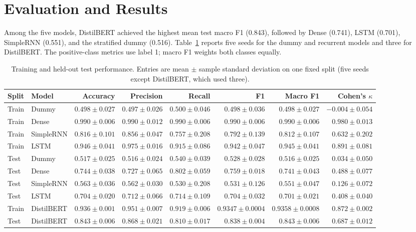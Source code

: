 \section{Evaluation and Results}
\label{sec:evaluation}

Among the five models, DistilBERT achieved the highest mean test macro F1
(0.843), followed by Dense (0.741), LSTM (0.701), SimpleRNN (0.551), and
the stratified dummy (0.516). Table~\ref{tab:neural-results} reports five
seeds for the dummy and recurrent models and three for DistilBERT. The
positive-class metrics use label 1; macro F1 weights both classes equally.

\begin{table}[t]
\caption{Training and held-out test performance. Entries are mean $\pm$
sample standard deviation on one fixed split (five seeds except DistilBERT,
which used three).}
\label{tab:neural-results}
\centering\footnotesize
\begin{tabular}{@{}llrrrrrr@{}}
\toprule
Split & Model & Accuracy & Precision & Recall & F1 & Macro F1 & Cohen's $\kappa$\\
\midrule
Train & Dummy & $0.498\pm0.027$ & $0.497\pm0.026$ & $0.500\pm0.046$ & $0.498\pm0.036$ & $0.498\pm0.027$ & $-0.004\pm0.054$\\
Train & Dense & $0.990\pm0.006$ & $0.990\pm0.012$ & $0.990\pm0.006$ & $0.990\pm0.006$ & $0.990\pm0.006$ & $0.980\pm0.013$\\
Train & SimpleRNN & $0.816\pm0.101$ & $0.856\pm0.047$ & $0.757\pm0.208$ & $0.792\pm0.139$ & $0.812\pm0.107$ & $0.632\pm0.202$\\
Train & LSTM & $0.946\pm0.041$ & $0.975\pm0.016$ & $0.915\pm0.086$ & $0.942\pm0.047$ & $0.945\pm0.041$ & $0.891\pm0.081$\\
\midrule
Test & Dummy & $0.517\pm0.025$ & $0.516\pm0.024$ & $0.540\pm0.039$ & $0.528\pm0.028$ & $0.516\pm0.025$ & $0.034\pm0.050$\\
Test & Dense & $0.744\pm0.038$ & $0.727\pm0.065$ & $0.802\pm0.059$ & $0.759\pm0.018$ & $0.741\pm0.043$ & $0.488\pm0.077$\\
Test & SimpleRNN & $0.563\pm0.036$ & $0.562\pm0.030$ & $0.530\pm0.208$ & $0.531\pm0.126$ & $0.551\pm0.047$ & $0.126\pm0.072$\\
Test & LSTM & $0.704\pm0.020$ & $0.712\pm0.066$ & $0.714\pm0.109$ & $0.704\pm0.032$ & $0.701\pm0.021$ & $0.408\pm0.040$\\
Train & DistilBERT & $0.936\pm0.001$ & $0.951\pm0.007$ & $0.919\pm0.006$ & $0.9347\pm0.0004$ & $0.9358\pm0.0008$ & $0.872\pm0.002$\\
Test & DistilBERT & $0.843\pm0.006$ & $0.868\pm0.021$ & $0.810\pm0.017$ & $0.838\pm0.004$ & $0.843\pm0.006$ & $0.687\pm0.012$\\
\bottomrule
\end{tabular}
\end{table}

